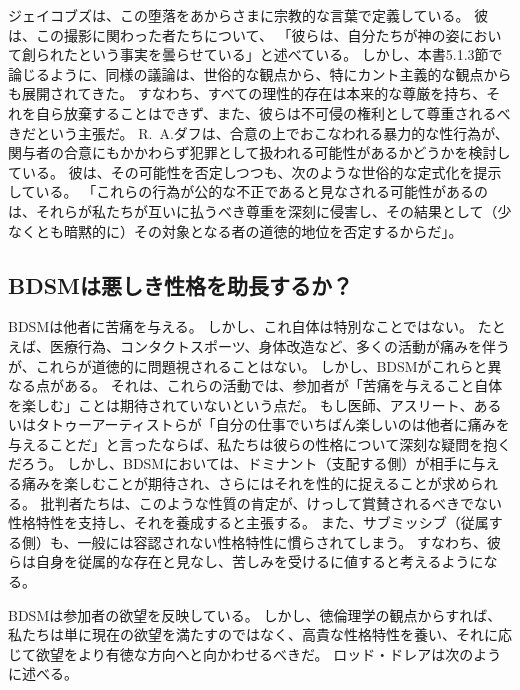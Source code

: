 \documentclass[paper=a4,book,openany]{jlreq}
\begin{document}
ジェイコブズは、この堕落をあからさまに宗教的な言葉で定義している。
彼は、この撮影に関わった者たちについて、 「彼らは、自分たちが神の姿において創られたという事実を曇らせている」\citep{jacobs03:_in_which_noah_millm_i}と述べている。
しかし、本書5.1.3節で論じるように、同様の議論は、世俗的な観点から、特にカント主義的な観点からも展開されてきた。
すなわち、すべての理性的存在は本来的な尊厳を持ち、それを自ら放棄することはできず、また、彼らは不可侵の権利として尊重されるべきだという主張だ。
R.~A.ダフは、合意の上でおこなわれる暴力的な性行為が、関与者の合意にもかかわらず犯罪として扱われる可能性があるかどうかを検討している。
彼は、その可能性を否定しつつも、次のような世俗的な定式化を提示している。
「これらの行為が公的な不正であると見なされる可能性があるのは、それらが私たちが互いに払うべき尊重を深刻に侵害し、その結果として（少なくとも暗黙的に）その対象となる者の道徳的地位を否定するからだ」\citep[p.232]{duff14:_towar_modes_legal_moral}。

\subsection{BDSMは悪しき性格を助長するか？}

BDSMは他者に苦痛を与える。
しかし、これ自体は特別なことではない。
たとえば、医療行為、コンタクトスポーツ、身体改造など、多くの活動が痛みを伴うが、これらが道徳的に問題視されることはない。
しかし、BDSMがこれらと異なる点がある。
それは、これらの活動では、参加者が「苦痛を与えること自体を楽しむ」ことは期待されていないという点だ。
もし医師、アスリート、あるいはタトゥーアーティストらが「自分の仕事でいちばん楽しいのは他者に痛みを与えることだ」と言ったならば、私たちは彼らの性格について深刻な疑問を抱くだろう。
しかし、BDSMにおいては、ドミナント（支配する側）が相手に与える痛みを楽しむことが期待され、さらにはそれを性的に捉えることが求められる。
批判者たちは、このような性質の肯定が、けっして賞賛されるべきでない性格特性を支持し、それを養成すると主張する。
また、サブミッシブ（従属する側）も、一般には容認されない性格特性に慣らされてしまう。
すなわち、彼らは自身を従属的な存在と見なし、苦しみを受けるに値すると考えるようになる。

BDSMは参加者の欲望を反映している。
しかし、徳倫理学の観点からすれば、私たちは単に現在の欲望を満たすのではなく、高貴な性格特性を養い、それに応じて欲望をより有徳な方向へと向かわせるべきだ。
ロッド・ドレアは次のように述べる。
\end{document}
